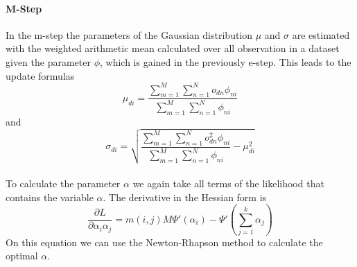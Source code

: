 \documentclass[11pt,a4paper]{article}
\begin{document}

  \paragraph{M-Step}
  
In the m-step the parameters of the Gaussian distribution $\mu$ and $\sigma$ are estimated with the weighted arithmetic mean calculated over all observation in a dataset given the parameter $\phi$, which is gained in the previously e-step. This leads to the update formulas
\begin{equation}
 \mu_{di} = \frac{\sum_{m=1}^M \sum_{n=1}^N o_{dn} \phi_{ni} }{\sum_{m=1}^M \sum_{n=1}^N  \phi_{ni}}
\end{equation}
and
\begin{equation}
 \sigma_{di} = \sqrt{\frac{\sum_{m=1}^M \sum_{n=1}^N o_{dn}^2 \phi_{ni} }{\sum_{m=1}^M \sum_{n=1}^N  \phi_{ni}} - \mu_{di}^2}
\end{equation}
\\
To calculate the parameter $\alpha$ we again take all terms of the likelihood that contains the variable $\alpha$. The derivative in the Hessian form is
\begin{equation}
 \frac{\partial L}{\partial \alpha_i\alpha_j} =  m(i,j) M \Psi'(\alpha_i) - \Psi'(\sum_{j=1}^k \alpha_j)
\end{equation}
On this equation we can use the Newton-Rhapson method to calculate the optimal $\alpha$.
\end{document}
